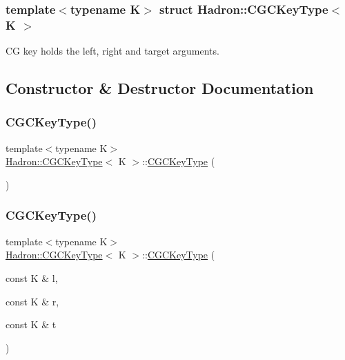 \subsubsection*{template$<$typename K$>$\newline
struct Hadron\+::\+C\+G\+C\+Key\+Type$<$ K $>$}

CG key holds the left, right and target arguments. 

\subsection{Constructor \& Destructor Documentation}
\mbox{\label{structHadron_1_1CGCKeyType_ae62b61c0cdc189bbdc1fb9c64780f03a}} 
\subsubsection{\texorpdfstring{CGCKeyType()}{CGCKeyType()}\hspace{0.1cm}{\footnotesize\ttfamily [1/4]}}
{\footnotesize\ttfamily template$<$typename K$>$ \\
\mbox{\hyperlink{structHadron_1_1CGCKeyType}{Hadron\+::\+C\+G\+C\+Key\+Type}}$<$ K $>$\+::\mbox{\hyperlink{structHadron_1_1CGCKeyType}{C\+G\+C\+Key\+Type}} (\begin{DoxyParamCaption}{ }\end{DoxyParamCaption})\hspace{0.3cm}{\ttfamily [inline]}}

\mbox{\label{structHadron_1_1CGCKeyType_a0547a9be19cf1cc084477d2eb8ee5d98}} 
\subsubsection{\texorpdfstring{CGCKeyType()}{CGCKeyType()}\hspace{0.1cm}{\footnotesize\ttfamily [2/4]}}
{\footnotesize\ttfamily template$<$typename K$>$ \\
\mbox{\hyperlink{structHadron_1_1CGCKeyType}{Hadron\+::\+C\+G\+C\+Key\+Type}}$<$ K $>$\+::\mbox{\hyperlink{structHadron_1_1CGCKeyType}{C\+G\+C\+Key\+Type}} (\begin{DoxyParamCaption}\item[{const K \&}]{l,  }\item[{const K \&}]{r,  }\item[{const K \&}]{t }\end{DoxyParamCaption})\hspace{0.3cm}{\ttfamily [inline]}}

